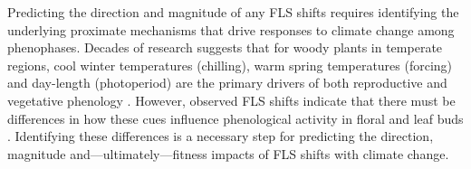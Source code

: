 \documentclass[11pt]{article}
\begin{document}
\noindent Predicting the direction and magnitude of any FLS shifts requires identifying the underlying proximate mechanisms that drive responses to climate change among phenophases. %
Decades of research suggests that for woody plants in temperate regions, cool winter temperatures (chilling), warm spring temperatures (forcing) and day-length (photoperiod) are the primary drivers of both reproductive and vegetative phenology \citep{Forrest2010,Flynn2018}. However, observed FLS shifts indicate that there must be differences in how these cues influence phenological activity in floral and leaf buds \citep{Buonaiuto2020}. %
Identifying these differences is a necessary step for predicting the direction, magnitude and---ultimately---fitness impacts of FLS shifts with climate change.\\ %
\end{document}
